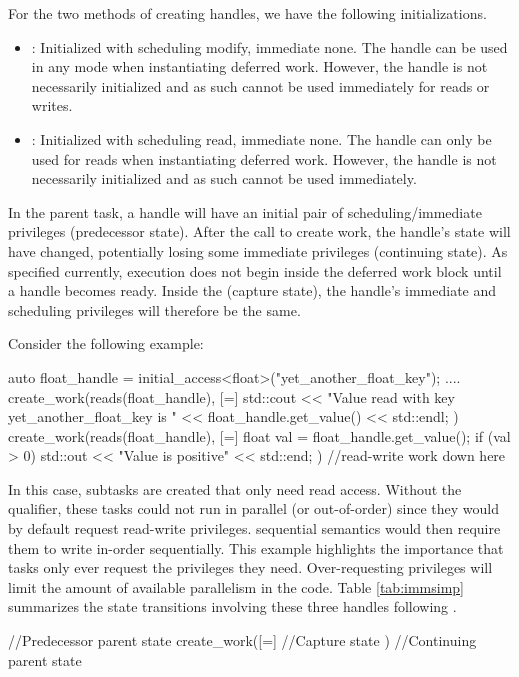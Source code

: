 For the two methods of creating handles, we have the following initializations.
\begin{itemize}
\item {}: Initialized with scheduling modify, immediate none. 
The handle can be used in any mode when instantiating deferred work.
However, the handle is not necessarily initialized and as such cannot be used immediately for reads or writes.
%
\item {}: Initialized with scheduling read, immediate none.
The handle can only be used for reads when instantiating deferred work.
However, the handle is not necessarily initialized and as such cannot be used immediately.
\end{itemize}


In the parent task, a handle will have an initial pair of scheduling/immediate privileges (predecessor state).
After the call to create work, the handle's state will have changed, potentially losing some immediate privileges (continuing state).
As specified currently, execution does not begin inside the deferred work block until a handle becomes ready.
Inside the \cwork (capture state), the handle's immediate and scheduling privileges will therefore be the same.

Consider the following example:
\begin{CppCode}
auto float_handle = initial_access<float>("yet_another_float_key");
....
create_work(reads(float_handle), [=] {
  std::cout << "Value read with key yet_another_float_key is " 
          << float_handle.get_value() << std::endl;
})
create_work(reads(float_handle), [=] {
  float val = float_handle.get_value();
  if (val > 0) std::out << "Value is positive" << std::end;
})
//read-write work down here
\end{CppCode}
In this case, subtasks are created that only need read access. 
Without the  qualifier, these \glspl{task} could not run in parallel (or out-of-order) since they
would by default request read-write privileges.
\Gls{sequential semantics} would then require them to write in-order sequentially.
This example highlights the importance that \glspl{task} only ever request the privileges they need. 
Over-requesting privileges will limit the amount of available parallelism in the code.
Table \ref{tab:immsimp} summarizes the state transitions involving these three handles following \cwork.
\begin{CppCode}
//Predecessor parent state
create_work([=]{
  //Capture state
})
//Continuing parent state
\end{CppCode}

